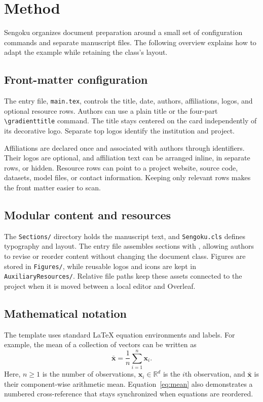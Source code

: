 \section{Method}
\label{sec:method}

Sengoku organizes document preparation around a small set of configuration commands and separate manuscript files. The following overview explains how to adapt the example while retaining the class's layout.

\subsection{Front-matter configuration}

The entry file, \texttt{main.tex}, controls the title, date, authors, affiliations, logos, and optional resource rows. Authors can use a plain title or the four-part \verb|\gradienttitle| command. The title stays centered on the card independently of its decorative logo. Separate top logos identify the institution and project.

Affiliations are declared once and associated with authors through identifiers. Their logos are optional, and affiliation text can be arranged inline, in separate rows, or hidden. Resource rows can point to a project website, source code, datasets, model files, or contact information. Keeping only relevant rows makes the front matter easier to scan.

\subsection{Modular content and resources}

The \texttt{Sections/} directory holds the manuscript text, and \texttt{Sengoku.cls} defines typography and layout. The entry file assembles sections with \verb||, allowing authors to revise or reorder content without changing the document class. Figures are stored in \texttt{Figures/}, while reusable logos and icons are kept in \texttt{AuxiliaryResources/}. Relative file paths keep these assets connected to the project when it is moved between a local editor and Overleaf.

\subsection{Mathematical notation}

The template uses standard \LaTeX{} equation environments and labels. For example, the mean of a collection of vectors can be written as
\begin{equation}
  \bar{\mathbf{x}} = \frac{1}{n}\sum_{i=1}^{n} \mathbf{x}_i.
  \label{eq:mean}
\end{equation}
Here, $n \geq 1$ is the number of observations, $\mathbf{x}_i \in \mathbb{R}^{d}$ is the $i$th observation, and $\bar{\mathbf{x}}$ is their component-wise arithmetic mean. Equation~\eqref{eq:mean} also demonstrates a numbered cross-reference that stays synchronized when equations are reordered.
